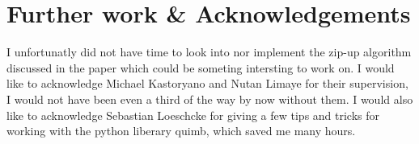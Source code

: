 \section{Further work \& Acknowledgements}
I unfortunatly did not have time to look into nor implement the zip-up algorithm discussed in the paper which could be someting intersting to work on. 
I would like to acknowledge Michael Kastoryano and Nutan Limaye for their supervision, I would not have been even a third of the way by now without them. I would also like to acknowledge Sebastian Loeschcke for giving a few tips and tricks for working with the python liberary quimb, which saved me many hours.  
